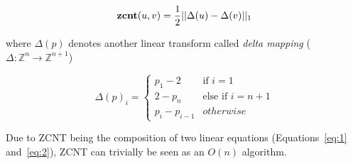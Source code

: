 \begin{equation} \label{eq:1}
    \textbf{zcnt}(u, v) = \frac{1}{2} ||\Delta (u) - \Delta (v)||_1
\end{equation}

where $\Delta (p)$ denotes another linear transform called {\it delta mapping\/} ($\Delta: \mathbb{Z}^{n} \rightarrow \mathbb{Z}^{n + 1}$)

\begin{equation} \label{eq:2}
    \Delta {(p)}_i = \begin{cases}
        p_1 - 2 & \text{if } i=1 \\ 
        2 - p_n & \text{else if } i=n+1 \\
        p_i - p_{i-1} & otherwise
    \end{cases}
\end{equation}

Due to ZCNT being the composition of two linear equations (Equations~\ref{eq:1} and~\ref{eq:2}), ZCNT can trivially be seen as an $O(n)$ algorithm. 